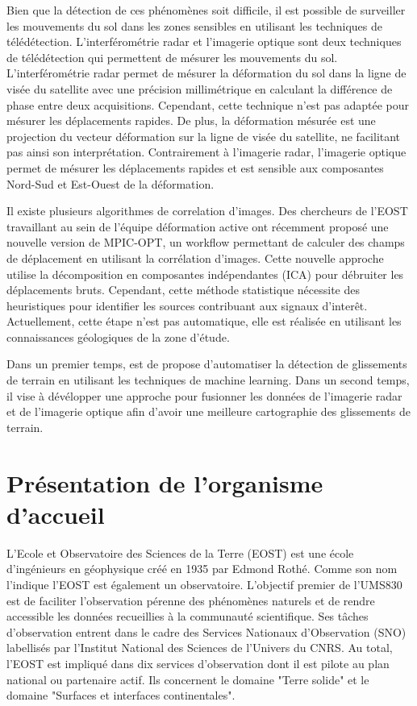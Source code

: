 \documentclass[11pt, openany]{report}
\begin{document}
Bien que la détection de ces phénomènes soit difficile, il est possible de surveiller les mouvements du sol dans les zones sensibles en utilisant les techniques de télédétection. L'interférométrie radar et l'imagerie optique sont deux techniques de télédétection qui permettent de mésurer les mouvements du sol. L'interférométrie radar permet de mésurer la déformation du sol dans la ligne de visée du satellite avec une précision millimétrique en calculant la différence de phase entre deux acquisitions. Cependant, cette technique n'est pas adaptée pour mésurer les déplacements rapides. De plus, la déformation mésurée est une projection du vecteur déformation sur la ligne de visée du satellite, ne facilitant pas ainsi son interprétation. Contrairement à l'imagerie radar, l'imagerie optique permet de mésurer les déplacements rapides et est sensible aux composantes Nord-Sud et Est-Ouest de la déformation.

Il existe plusieurs algorithmes de correlation d'images. Des chercheurs de l'EOST travaillant au sein de l'équipe déformation active ont récemment proposé une nouvelle version de MPIC-OPT, un workflow permettant de calculer des champs de déplacement en utilisant la corrélation d'images. Cette nouvelle approche utilise la décomposition en composantes indépendantes (ICA) pour débruiter les déplacements bruts. Cependant, cette méthode statistique nécessite des heuristiques pour identifier les sources contribuant aux signaux d'interêt. Actuellement, cette étape n'est pas automatique, elle est réalisée en utilisant les connaissances géologiques de la zone d'étude.\par

Dans un premier temps, est de propose d'automatiser la détection de glissements de terrain en utilisant les techniques de machine learning. Dans un second temps, il vise à dévélopper une approche pour fusionner les données de l'imagerie radar et de l'imagerie optique afin d'avoir une meilleure cartographie des glissements de terrain.

\chapter{Présentation de l'organisme d'accueil}
L'Ecole et Observatoire des Sciences de la Terre (EOST) est une école d'ingénieurs en géophysique
créé en 1935 par Edmond Rothé. Comme son nom l'indique l'EOST est également un observatoire. L’objectif premier de l’UMS830 est de faciliter l'observation pérenne des phénomènes naturels et de rendre accessible les données recueillies à la communauté scientifique. Ses tâches d'observation entrent dans le cadre des Services Nationaux d'Observation (SNO) labellisés par l'Institut National des Sciences de l'Univers du CNRS. Au total, l'EOST est impliqué dans dix services d'observation dont il est pilote au plan national ou partenaire actif. Ils concernent le domaine "Terre solide" et le domaine "Surfaces et interfaces continentales".
\end{document}
